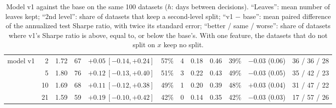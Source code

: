\documentclass[11pt,a4paper]{article}
\newcommand{\1}{\mathbf{1}}
\begin{document}
\begin{table}[H]
\begin{tabular}{@{}l r r r l r r r r r r r@{}}
model v1 & 2 & 1.72 & 67 & $+0.05\ [-0.14,+0.24]$ & 57\% & 4 & 0.18 & 0.46 & 39\% & $-0.03$ (0.06) & 36 / 36 / 28\\
 & 5 & 1.80 & 76 & $+0.12\ [-0.13,+0.40]$ & 51\% & 3 & 0.22 & 0.43 & 49\% & $-0.03$ (0.05) & 35 / 42 / 23\\
 & 10 & 1.69 & 68 & $+0.11\ [-0.12,+0.38]$ & 49\% & 1 & 0.20 & 0.39 & 48\% & $+0.03$ (0.04) & 31 / 47 / 22\\
 & 21 & 1.59 & 59 & $+0.19\ [-0.10,+0.42]$ & 42\% & 0 & 0.14 & 0.35 & 42\% & $-0.03$ (0.03) & 17 / 57 / 26\\
\bottomrule
\end{tabular}
\caption{Model v1 against the base on the same 100 datasets ($h$: days between decisions). ``Leaves'': mean number of leaves kept; ``2nd level'': share of datasets that keep a second-level split; ``v1 $-$ base'': mean paired difference of the annualized test Sharpe ratio, with twice its standard error; ``better / same / worse'': share of datasets where v1's Sharpe ratio is above, equal to, or below the base's. With one feature, the datasets that do not split on $x$ keep no split.}
\label{tab:v1}
\end{table}
\end{document}
